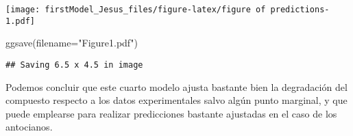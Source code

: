 \documentclass[
]{article}
\newenvironment{Shaded}{\begin{snugshade}}{\end{snugshade}}
\newcommand{\AttributeTok}[1]{\textcolor[rgb]{0.77,0.63,0.00}{#1}}
\newcommand{\FunctionTok}[1]{\textcolor[rgb]{0.00,0.00,0.00}{#1}}
\newcommand{\NormalTok}[1]{#1}
\newcommand{\StringTok}[1]{\textcolor[rgb]{0.31,0.60,0.02}{#1}}
\begin{document}
\texttt{[image: firstModel\_Jesus\_files/figure-latex/figure of predictions-1.pdf]}

\begin{Shaded}
\begin{Highlighting}[]
\FunctionTok{ggsave}\NormalTok{(}\AttributeTok{filename=}\StringTok{"Figure1.pdf"}\NormalTok{)}
\end{Highlighting}
\end{Shaded}

\begin{verbatim}
## Saving 6.5 x 4.5 in image
\end{verbatim}

Podemos concluir que este cuarto modelo ajusta bastante bien la
degradación del compuesto respecto a los datos experimentales salvo
algún punto marginal, y que puede emplearse para realizar predicciones
bastante ajustadas en el caso de los antocianos.
\end{document}
